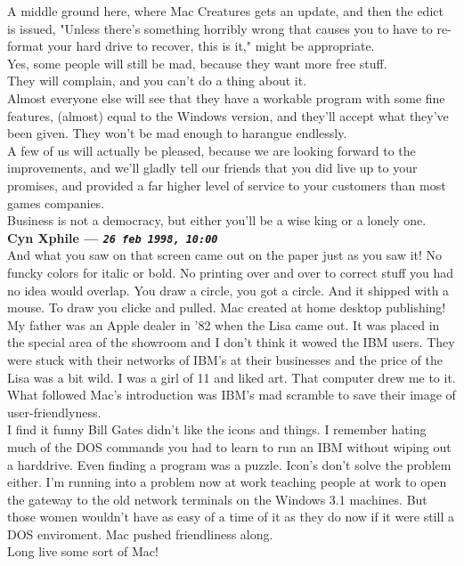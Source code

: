 \documentclass[11pt,twoside,a4paper]{article}
\begin{document}
\begin{multicols*}{2}
A middle ground here, where Mac Creatures gets an update, and then the edict is issued, "Unless there's something horribly wrong that causes you to have to re-format your hard drive to recover, this is it," might be appropriate.~\\

Yes, some people will still be mad, because they want more free stuff.~\\
They will complain, and you can't do a thing about it.~\\

Almost everyone else will see that they have a workable program with some fine features, (almost) equal to the Windows version, and they'll accept what they've been given. They won't be mad enough to harangue endlessly.~\\

A few of us will actually be pleased, because we are looking forward to the improvements, and we'll gladly tell our friends that you did live up to your promises, and provided a far higher level of service to your customers than most games companies.~\\

Business is not a democracy, but either you'll be a wise king or a lonely one.~\\

 
		
	
		
\textbf{Cyn Xphile --- \emph{\texttt{26 feb 1998, 10:00}}}~\\

And what you saw on that screen came out on the paper just as you saw it!  No funcky colors for italic or bold.  No printing over and over to correct stuff you had no idea would overlap.  You draw a circle, you got a circle. And it shipped with a mouse.  To draw you clicke and pulled.  Mac created at home desktop publishing! ~\\
My father was an Apple dealer in '82 when the Lisa came out.  It was placed in the special area of the showroom and I don't think it wowed the IBM users. They were stuck with their networks of IBM's at their businesses and the price of the Lisa was a bit wild.  I was a girl of 11 and liked art.  That computer drew me to it.  What followed Mac's introduction was IBM's mad scramble to save their image of user-friendlyness.~\\

I find it funny Bill Gates didn't like the icons and things.  I remember hating much of the DOS commands you had to learn to run an IBM without wiping out a harddrive.  Even finding a program was a puzzle. Icon's don't solve the problem either.  I'm running into a problem now at work teaching people at work to open the gateway to the old network terminals on the Windows 3.1 machines.  But those women wouldn't have as easy of a time of it as they do now if it were still a DOS enviroment.  Mac pushed friendliness along.~\\
Long live some sort of Mac!~\\


\end{multicols*}
\end{document}
